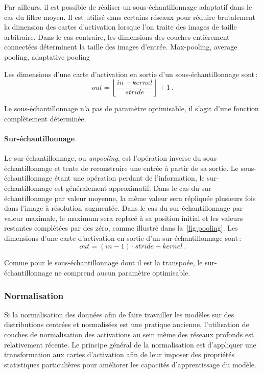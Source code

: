 Par ailleurs, il est possible de réaliser un sous-échantillonnage adaptatif dans le cas du filtre moyen. Il est utilisé dans certains réseaux pour réduire brutalement la dimension des cartes d'activation lorsque l'on traite des images de taille arbitraire. Dans le cas contraire, les dimensions des couches entièrement connectées déterminent la taille des images d'entrée.
Max-pooling, average pooling, adaptative pooling

Les dimensions d'une carte d'activation en sortie d'un sous-échantillonnage sont\,:
$$\mathit{out} = \left\lfloor \frac{\mathit{in} - \mathit{kernel}}{\mathit{stride}}\right\rfloor + 1~.$$

Le sous-échantillonnage n'a pas de paramètre optimisable, il s'agit d'une fonction complètement déterminée.

\paragraph{Sur-échantillonnage}

Le sur-échantillonnage, ou \emph{unpooling}, est l'opération inverse du sous-échantillonnage et tente de reconstruire une entrée à partir de sa sortie. Le sous-échantillonnage étant une opération perdant de l'information, le sur-échantillonnage est généralement approximatif. Dans le cas du sur-échantillonnage par valeur moyenne, la même valeur sera répliquée plusieurs fois dans l'image à résolution augmentée. Dans le cas du sur-échantillonnage par valeur maximale, le maximum sera replacé à sa position initial et les valeurs restantes complétées par des zéro, comme illustré dans la~\cref{fig:pooling}.
Les dimensions d'une carte d'activation en sortie d'un sur-échantillonnage sont\,:
$$\mathit{out} = (\mathit{in} - 1) \cdot \mathit{stride} + \mathit{kernel}~.$$

Comme pour le sous-échantillonnage dont il est la transpoée, le sur-échantillonnage ne comprend aucun paramètre optimisable.

\subsubsection{Normalisation}

Si la normalisation des données afin de faire travailler les modèles sur des distributions centrées et normalisées est une pratique ancienne, l'utilisation de couches de normalisation des activations au sein même des réseaux profonds est relativement récente. Le principe général de la normalisation est d'appliquer une transformation aux cartes d'activation afin de leur imposer des propriétés statistiques particulières pour améliorer les capacités d'apprentissage du modèle.

